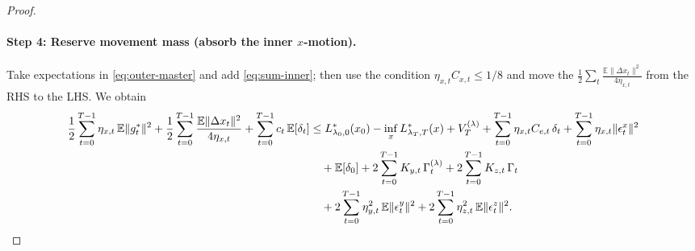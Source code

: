 \documentclass{uai2026} %
\newcommand{\EE}{\mathbb{E}}
\begin{document}
\begin{proof}
\paragraph{Step 4: Reserve movement mass (absorb the inner $x$-motion).}
Take expectations in \eqref{eq:outer-master} and add \eqref{eq:sum-inner}; then use the condition $\eta_{x,t}C_{x,t}\le 1/8$ and move the
$\frac12\sum_t \frac{\EE\|\Delta x_t\|^2}{4\eta_{x,t}}$ from the RHS to the LHS. We obtain
\begin{align}
\frac12\sum_{t=0}^{T-1} \eta_{x,t}\,\EE\|g_t^{*}\|^2
+ \frac{1}{2}\sum_{t=0}^{T-1} \frac{\EE\|\Delta x_t\|^2}{4\eta_{x,t}}
+ \sum_{t=0}^{T-1} c_t\,\EE[\delta_t]
&\le L^{*}_{\lambda_0,0}(x_0) - \inf_x L^{*}_{\lambda_T,T}(x) + V_T^{(\lambda)} + \sum_{t=0}^{T-1} \eta_{x,t}C_{e,t}\,\delta_t+\sum_{t=0}^{T-1} \eta_{x,t}\|\epsilon_t^x\|^2\notag\\
&\quad + \EE[\delta_0]
+ 2\sum_{t=0}^{T-1} K_{y,t}\,\Gamma_t^{(\lambda)} + 2\sum_{t=0}^{T-1} K_{z,t}\,\Gamma_t \notag\\
&\quad + 2\sum_{t=0}^{T-1} \eta_{y,t}^2\,\EE\|\epsilon_t^y\|^2
+ 2\sum_{t=0}^{T-1} \eta_{z,t}^2\,\EE\|\epsilon_t^z\|^2. \label{eq:outer+inner-absorbed}
\end{align}

\end{proof}
\end{document}
